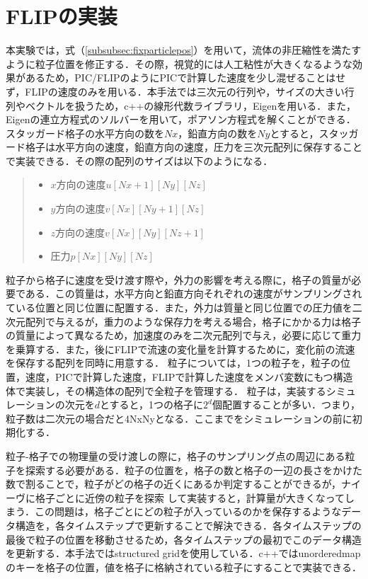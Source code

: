 \documentclass[a4j,12pt]{jreport}
\begin{document}
\section{FLIPの実装} \label{sec:ImpFLIP}
本実験では，式（\ref{subsubsec:fixparticlepos}）を用いて，流体の非圧縮性を満たすように粒子位置を修正する．その際，視覚的には人工粘性が大きくなるような効果があるため，PIC/FLIPのようにPICで計算した速度を少し混ぜることはせず，FLIPの速度のみを用いる．本手法では三次元の行列や，サイズの大きい行列やベクトルを扱うため，c++の線形代数ライブラリ，Eigenを用いる．また，Eigenの連立方程式のソルバーを用いて，ポアソン方程式を解くことができる．
スタッガード格子の水平方向の数を$Nx$，鉛直方向の数を$Ny$とすると，スタッガード格子は水平方向の速度，鉛直方向の速度，圧力を三次元配列に保存することで実装できる．その際の配列のサイズは以下のようになる．
\begin{quote}
	\begin{itemize}
		\item $x方向の速度 u[Nx+1][Ny][Nz]$ 
		\item $y方向の速度 v[Nx][Ny+1][Nz]$ 
		\item $z方向の速度 v[Nx][Ny][Nz+1]$ 
		\item $圧力 p[Nx][Ny][Nz]$
	\end{itemize}
\end{quote}
粒子から格子に速度を受け渡す際や，外力の影響を考える際に，格子の質量が必要である．この質量は，水平方向と鉛直方向それぞれの速度がサンプリングされている位置と同じ位置に配置する．また，外力は質量と同じ位置での圧力値を二次元配列で与えるが，重力のような保存力を考える場合，格子にかかる力は格子の質量によって異なるため，加速度のみを二次元配列で与え，必要に応じて重力を乗算する．また，後にFLIPで流速の変化量を計算するために，変化前の流速を保存する配列を同時に用意する．
粒子については，1つの粒子を，粒子の位置，速度，PICで計算した速度，FLIPで計算した速度をメンバ変数にもつ構造体で実装し，その構造体の配列で全粒子を管理する．
粒子は，実装するシミュレーションの次元を$d$とすると，1つの格子に$2^d$個配置することが多い．つまり，粒子数は二次元の場合だと4NxNyとなる．ここまでをシミュレーションの前に初期化する．

粒子-格子での物理量の受け渡しの際に，格子のサンプリング点の周辺にある粒子を探索する必要がある．粒子の位置を，格子の数と格子の一辺の長さをかけた数で割ることで，粒子がどの格子の近くにあるか判定することができるが，ナイーヴに格子ごとに近傍の粒子を探索
して実装すると，計算量が大きくなってしまう．この問題は，格子ごとにどの粒子が入っているのかを保存するようなデータ構造を，各タイムステップで更新することで解決できる．各タイムステップの最後で粒子の位置を移動させるため，各タイムステップの最初でこのデータ構造を更新する．本手法ではstructured gridを使用している．c++ではunorderedmapのキーを格子の位置，値を格子に格納されている粒子にすることで実装できる．
\end{document}
